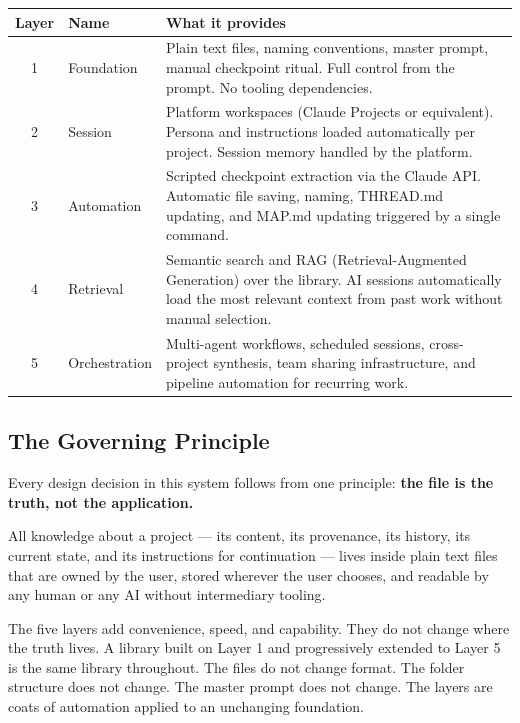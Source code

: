 \documentclass[12pt,letterpaper]{article}
\begin{document}
\begin{center}
\begin{tabular}{@{}clp{8cm}@{}}
\toprule
\textbf{Layer} & \textbf{Name} & \textbf{What it provides} \\
\midrule
1 & Foundation & Plain text files, naming conventions, master prompt,
                 manual checkpoint ritual. Full control from the prompt.
                 No tooling dependencies. \\
2 & Session & Platform workspaces (Claude Projects or equivalent).
              Persona and instructions loaded automatically per project.
              Session memory handled by the platform. \\
3 & Automation & Scripted checkpoint extraction via the Claude API.
                 Automatic file saving, naming, THREAD.md updating,
                 and MAP.md updating triggered by a single command. \\
4 & Retrieval & Semantic search and RAG (Retrieval-Augmented Generation)
                over the library. AI sessions automatically load the most
                relevant context from past work without manual selection. \\
5 & Orchestration & Multi-agent workflows, scheduled sessions, cross-project
                    synthesis, team sharing infrastructure, and pipeline
                    automation for recurring work. \\
\bottomrule
\end{tabular}
\end{center}

\subsection{The Governing Principle}

Every design decision in this system follows from one principle:
\textbf{the file is the truth, not the application.}

All knowledge about a project --- its content, its provenance, its history,
its current state, and its instructions for continuation --- lives inside
plain text files that are owned by the user, stored wherever the user chooses,
and readable by any human or any AI without intermediary tooling.

The five layers add convenience, speed, and capability. They do not change
where the truth lives. A library built on Layer 1 and progressively extended
to Layer 5 is the same library throughout. The files do not change format.
The folder structure does not change. The master prompt does not change.
The layers are coats of automation applied to an unchanging foundation.
\end{document}
